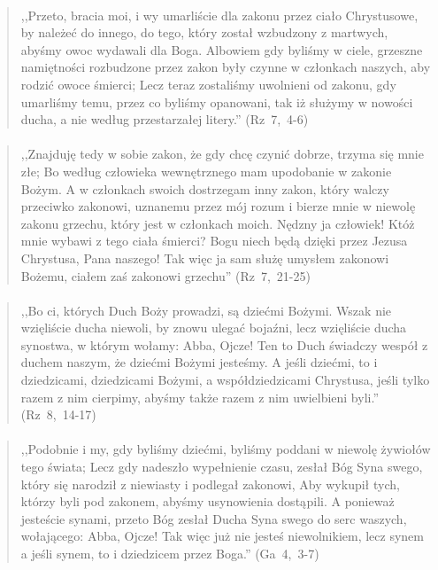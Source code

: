 \documentclass[10pt,a4paper,oneside]{article}
\begin{document}
\paragraph{}
\begin{quote}
,,Przeto, bracia moi, i wy umarliście dla zakonu przez ciało Chrystusowe, by należeć do innego, do tego, który został wzbudzony z martwych, abyśmy owoc wydawali dla Boga. Albowiem gdy byliśmy w ciele, grzeszne namiętności rozbudzone przez zakon były czynne w członkach naszych, aby rodzić owoce śmierci; Lecz teraz zostaliśmy uwolnieni od zakonu, gdy umarliśmy temu, przez co byliśmy opanowani, tak iż służymy w nowości ducha, a nie według przestarzałej litery.'' \mbox{(Rz 7, 4-6)}
\end{quote}
\paragraph{}
\begin{quote}
,,Znajduję tedy w sobie zakon, że gdy chcę czynić dobrze, trzyma się mnie złe; Bo według człowieka wewnętrznego mam upodobanie w zakonie Bożym. A w członkach swoich dostrzegam inny zakon, który walczy przeciwko zakonowi, uznanemu przez mój rozum i bierze mnie w niewolę zakonu grzechu, który jest w członkach moich. Nędzny ja człowiek! Któż mnie wybawi z tego ciała śmierci? Bogu niech będą dzięki przez Jezusa Chrystusa, Pana naszego! Tak więc ja sam służę umysłem zakonowi Bożemu, ciałem zaś zakonowi grzechu'' \mbox{(Rz 7, 21-25)}
\end{quote}
\paragraph{}
\begin{quote}
,,Bo ci, których Duch Boży prowadzi, są dziećmi Bożymi. Wszak nie wzięliście ducha niewoli, by znowu ulegać bojaźni, lecz wzięliście ducha synostwa, w którym wołamy: Abba, Ojcze! Ten to Duch świadczy wespół z duchem naszym, że dziećmi Bożymi jesteśmy. A jeśli dziećmi, to i dziedzicami, dziedzicami Bożymi, a współdziedzicami Chrystusa, jeśli tylko razem z nim cierpimy, abyśmy także razem z nim uwielbieni byli.'' \mbox{(Rz 8, 14-17)}
\end{quote}
\paragraph{}
\begin{quote}
,,Podobnie i my, gdy byliśmy dziećmi, byliśmy poddani w niewolę żywiołów tego świata; Lecz gdy nadeszło wypełnienie czasu, zesłał Bóg Syna swego, który się narodził z niewiasty i podlegał zakonowi, Aby wykupił tych, którzy byli pod zakonem, abyśmy usynowienia dostąpili. A ponieważ jesteście synami, przeto Bóg zesłał Ducha Syna swego do serc waszych, wołającego: Abba, Ojcze! Tak więc już nie jesteś niewolnikiem, lecz synem a jeśli synem, to i dziedzicem przez Boga.'' \mbox{(Ga 4, 3-7)}
\end{quote}
\end{document}
